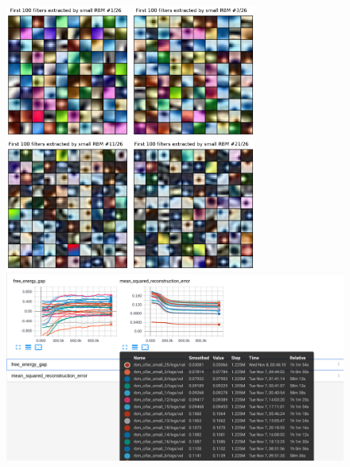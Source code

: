 \clearpage
\begin{figure}[h]
\begin{mdframed}
\centering
\includegraphics[width=1.6in]{dbm-cifar-latest/rbm_small_0.png}
\quad
\includegraphics[width=1.6in]{dbm-cifar-latest/rbm_small_2.png}
\\[1em]
\includegraphics[width=1.6in]{dbm-cifar-latest/rbm_small_10.png}
\quad
\includegraphics[width=1.6in]{dbm-cifar-latest/rbm_small_20.png}
\\[1em]
\includegraphics[width=6.4in]{dbm-cifar-latest/small_rbms.png}

\end{mdframed}
\end{figure}
